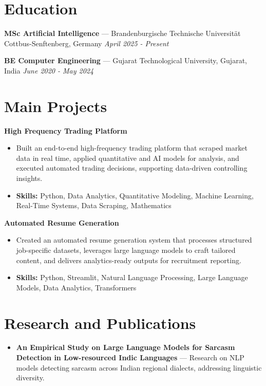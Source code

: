 \documentclass[a4paper,10pt]{article}
\begin{document}
\section*{Education}
\textbf{MSc Artificial Intelligence} — Brandenburgische Technische Universität Cottbus-Senftenberg, Germany \hfill \textit{April 2025 - Present}\par
\vspace{1.5pt}
\textbf{BE Computer Engineering} — Gujarat Technological University, Gujarat, India \hfill \textit{June 2020 - May 2024}\par

\section*{Main Projects}
\textbf{High Frequency Trading Platform}\par
\vspace{1pt}
\begin{itemize}
  \item Built an end-to-end high-frequency trading platform that scraped market data in real time, applied quantitative and AI models for analysis, and executed automated trading decisions, supporting data-driven controlling insights.
  \item \textbf{Skills:} Python, Data Analytics, Quantitative Modeling, Machine Learning, Real-Time Systems, Data Scraping, Mathematics
\end{itemize}
\vspace{3pt}
\textbf{Automated Resume Generation}\par
\vspace{1pt}
\begin{itemize}
  \item Created an automated resume generation system that processes structured job-specific datasets, leverages large language models to craft tailored content, and delivers analytics-ready outputs for recruitment reporting.
  \item \textbf{Skills:} Python, Streamlit, Natural Language Processing, Large Language Models, Data Analytics, Transformers
\end{itemize}

\section*{Research and Publications}
\begin{itemize}
\item \textbf{An Empirical Study on Large Language Models for Sarcasm Detection in Low-resourced Indic Languages} — Research on NLP models detecting sarcasm across Indian regional dialects, addressing linguistic diversity.
\end{itemize}
\end{document}
